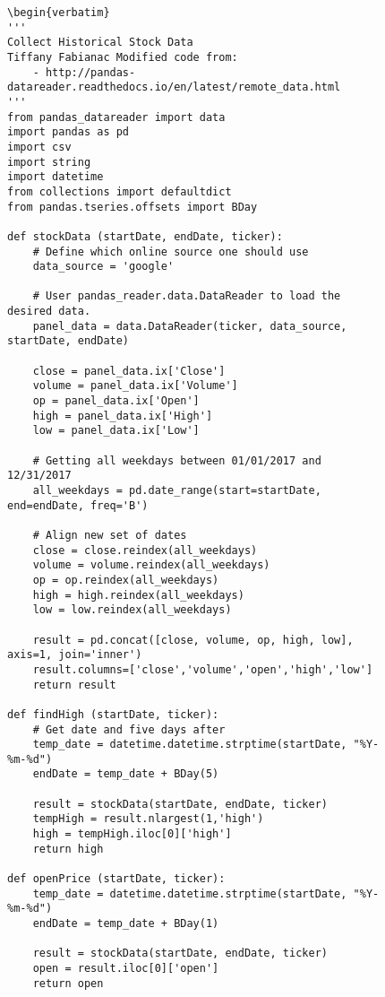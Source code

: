 \documentclass[sigconf]{acmart}
\begin{document}
\begin{figure}[htb]
\begin{lstlisting}
\begin{verbatim}
'''
Collect Historical Stock Data
Tiffany Fabianac Modified code from:
    - http://pandas-datareader.readthedocs.io/en/latest/remote_data.html
'''
from pandas_datareader import data
import pandas as pd
import csv
import string
import datetime
from collections import defaultdict
from pandas.tseries.offsets import BDay

def stockData (startDate, endDate, ticker):
	# Define which online source one should use
	data_source = 'google'

	# User pandas_reader.data.DataReader to load the desired data.
	panel_data = data.DataReader(ticker, data_source, startDate, endDate)

	close = panel_data.ix['Close']
	volume = panel_data.ix['Volume']
	op = panel_data.ix['Open']
	high = panel_data.ix['High']
	low = panel_data.ix['Low']

	# Getting all weekdays between 01/01/2017 and 12/31/2017
	all_weekdays = pd.date_range(start=startDate, end=endDate, freq='B')

	# Align new set of dates
	close = close.reindex(all_weekdays)
	volume = volume.reindex(all_weekdays)
	op = op.reindex(all_weekdays)
	high = high.reindex(all_weekdays)
	low = low.reindex(all_weekdays)

	result = pd.concat([close, volume, op, high, low], axis=1, join='inner')
	result.columns=['close','volume','open','high','low']
	return result
	
def findHigh (startDate, ticker):
	# Get date and five days after
	temp_date = datetime.datetime.strptime(startDate, "%Y-%m-%d")
	endDate = temp_date + BDay(5)

	result = stockData(startDate, endDate, ticker)
	tempHigh = result.nlargest(1,'high')
	high = tempHigh.iloc[0]['high']
	return high

def openPrice (startDate, ticker):
	temp_date = datetime.datetime.strptime(startDate, "%Y-%m-%d")
	endDate = temp_date + BDay(1)

	result = stockData(startDate, endDate, ticker)
	open = result.iloc[0]['open']
	return open


\end{lstlisting}
\end{figure}
\end{document}
